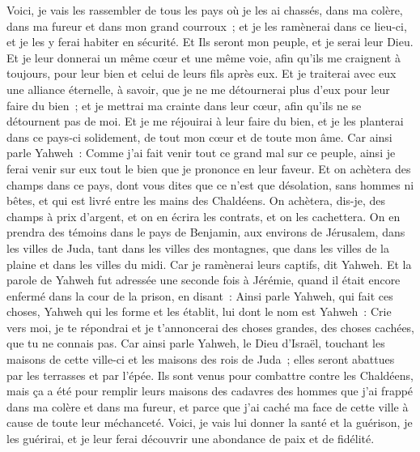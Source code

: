 \begin{multicols}{2}
Voici, je vais les rassembler de tous les pays où je les ai chassés, dans ma colère, dans ma fureur et dans mon grand courroux~; et je les ramènerai dans ce lieu-ci, et je les y ferai habiter en sécurité.
Et Ils seront mon peuple, et je serai leur Dieu.
Et je leur donnerai un même cœur et une même voie, afin qu'ils me craignent à toujours, pour leur bien et celui de leurs fils après eux.
Et je traiterai avec eux une alliance éternelle, à savoir, que je ne me détournerai plus d'eux pour leur faire du bien~; et je mettrai ma crainte dans leur cœur, afin qu'ils ne se détournent pas de moi.
Et je me réjouirai à leur faire du bien, et je les planterai dans ce pays-ci solidement, de tout mon cœur et de toute mon âme.
Car ainsi parle Yahweh~: Comme j'ai fait venir tout ce grand mal sur ce peuple, ainsi je ferai venir sur eux tout le bien que je prononce en leur faveur.
Et on achètera des champs dans ce pays, dont vous dites que ce n'est que désolation, sans hommes ni bêtes, et qui est livré entre les mains des Chaldéens.
On achètera, dis-je, des champs à prix d'argent, et on en écrira les contrats, et on les cachettera. On en prendra des témoins dans le pays de Benjamin, aux environs de Jérusalem, dans les villes de Juda, tant dans les villes des montagnes, que dans les villes de la plaine et dans les villes du midi. Car je ramènerai leurs captifs, dit Yahweh.
\VerseOne{}Et la parole de Yahweh fut adressée une seconde fois à Jérémie, quand il était encore enfermé dans la cour de la prison, en disant~:
Ainsi parle Yahweh, qui fait ces choses, Yahweh qui les forme et les établit, lui dont le nom est Yahweh~:
Crie vers moi, je te répondrai et je t'annoncerai des choses grandes, des choses cachées, que tu ne connais pas.
Car ainsi parle Yahweh, le Dieu d'Israël, touchant les maisons de cette ville-ci et les maisons des rois de Juda~; elles seront abattues par les terrasses et par l'épée.
Ils sont venus pour combattre contre les Chaldéens, mais ça a été pour remplir leurs maisons des cadavres des hommes que j'ai frappé dans ma colère et dans ma fureur, et parce que j'ai caché ma face de cette ville à cause de toute leur méchanceté.
Voici, je vais lui donner la santé et la guérison, je les guérirai, et je leur ferai découvrir une abondance de paix et de fidélité.

\end{multicols}
